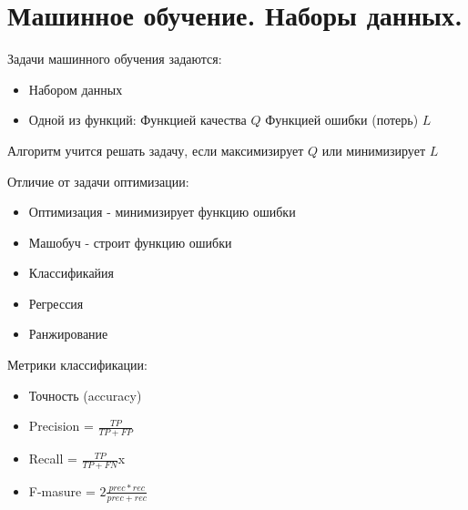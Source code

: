 \section{Машинное обучение. Наборы данных.}


Задачи машинного обучения задаются:
\begin{itemize}
    \item Набором данных
    \item Одной из функций:
    \subitem Функцией качества $Q$
    \subitem Функцией ошибки (потерь) $L$
\end{itemize}

Алгоритм учится решать задачу, если максимизирует $Q$ или
минимизирует $L$

Отличие от задачи оптимизации:
\begin{itemize}
    \item Оптимизация - минимизирует функцию ошибки
    \item Машобуч - строит функцию ошибки
\end{itemize}


\begin{itemize}
    \item Классификайия
    \item Регрессия
    \item Ранжирование
\end{itemize}

Метрики классификации:
\begin{itemize}
    \item Точность (accuracy)
    \item Precision = $\frac{TP}{TP + FP}$
    \item Recall = $\frac{TP}{TP + FN}$x
    \item F-masure = $2\frac{prec * rec}{prec + rec}$
\end{itemize}

